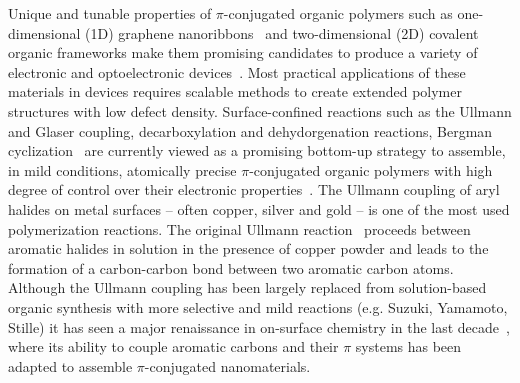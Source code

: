 \documentclass[aps,prb,reprint,amsmath,amssymb]{revtex4-1}
\newcommand{\lock}{\color{red}}
\newcommand{\lock}{\color{black}}
\begin{document}



{\lock

Unique and tunable properties of $\pi$-conjugated organic polymers such as one-dimensional (1D) graphene nanoribbons~\cite{ullmann_106, ullmann_45, ullmann_107, ullmann_101} and two-dimensional (2D) covalent organic frameworks make them promising candidates to produce a variety of electronic and optoelectronic devices~\cite{ullmann_113, ullmann_114}.
Most practical applications of these materials in devices requires scalable methods to create extended polymer structures with low defect density.
Surface-confined reactions such as the Ullmann and Glaser coupling, decarboxylation and dehydorgenation reactions, Bergman cyclization~\cite{ullmann_140} are currently viewed as a promising bottom-up strategy to assemble, in mild conditions, atomically precise $\pi$-conjugated organic polymers with high degree of control over their electronic properties~\cite{ullmann_33}. 
The Ullmann coupling of aryl halides on metal surfaces -- often copper, silver and gold -- is one of the most used polymerization reactions. 
The original Ullmann reaction~\cite{ullmann_01} proceeds between aromatic halides in solution in the presence of copper powder and leads to the formation of a carbon-carbon bond between two aromatic carbon atoms. 
Although the Ullmann coupling has been largely replaced from solution-based organic synthesis with more selective and mild reactions (e.g. Suzuki, Yamamoto, Stille) it has seen a major renaissance in on-surface chemistry in the last decade~\cite{DIMA-refs}, where its ability to couple aromatic carbons and their $\pi$ systems has been adapted to assemble $\pi$-conjugated nanomaterials.

\ifdefined\INTERNAL

}
\end{document}
